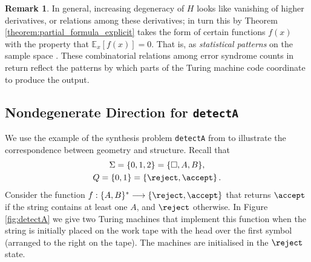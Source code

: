 \documentclass[english,letter paper,12pt,reqno]{article}
\theoremstyle{definition}
\newtheorem{remark}[theorem]{Remark}
\newcommand{\detectA}{\texttt{detectA}}
\newcommand{\lto}{\longrightarrow}
\begin{document}
\begin{remark}
In general, increasing degeneracy of $H$ looks like vanishing of higher derivatives, or relations among these derivatives; in turn this by Theorem \ref{theorem:partial_formula_explicit} takes the form of certain functions $f(x)$ with the property that $\mathbb{E}_x[f(x)] = 0$. That is, as \emph{statistical patterns} on the sample space \cite{shawe2004kernel}. These combinatorial relations among error syndrome counts in return reflect the patterns by which parts of the Turing machine code coordinate to produce the output. %
\end{remark}

\subsection{Nondegenerate Direction for \detectA}\label{section:nondeg_detectA}

We use the example of the synthesis problem {\detectA} from \cite{clift2021geometry} to illustrate the correspondence between geometry and structure. Recall that
\begin{gather*}
    \Sigma=\{0,1,2\} =\{\Box, A, B\},\\
    Q=\{0,1\} = \{\reject,\accept\}\,.
\end{gather*}
Consider the function $f: \{A,B\}^* \lto \{\reject,\accept\}$ that returns $\accept$ if the string contains at least one $A$, and $\reject$ otherwise. In Figure \ref{fig:detectA} we give two Turing machines that implement this function when the string is initially placed on the work tape with the head over the first symbol (arranged to the right on the tape). The machines are initialised in the $\reject$ state. %
\end{document}

